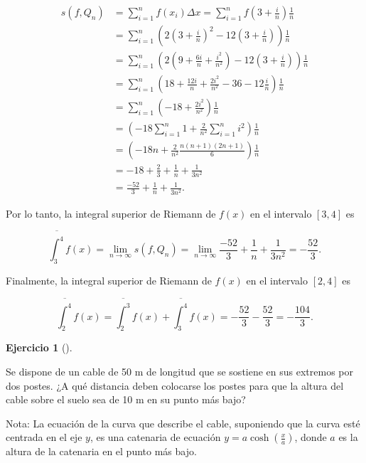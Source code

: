 \documentclass[
  spanish,
  a4paper,
]{scrreport}
\theoremstyle{definition}
\newtheorem{exercise}{Ejercicio}[chapter]
\theoremstyle{remark}
\begin{document}
\begin{tcolorbox}
\begin{align*}
s(f,Q_n)
&= \sum_{i=1}^{n} f(x_i) \Delta x = \sum_{i=1}^{n} f\left(3 + \frac{i}{n}\right) \frac{1}{n} \\
&= \sum_{i=1}^{n} \left(2\left(3 + \frac{i}{n}\right)^2 - 12\left(3 + \frac{i}{n}\right)\right) \frac{1}{n} \\
&= \sum_{i=1}^{n} \left(2\left(9 + \frac{6i}{n} + \frac{i^2}{n^2}\right) - 12\left(3 + \frac{i}{n}\right)\right) \frac{1}{n} \\
&= \sum_{i=1}^{n} \left(18 + \frac{12i}{n} + \frac{2i^2}{n^2} - 36 - 12\frac{i}{n}\right) \frac{1}{n} \\
&= \sum_{i=1}^{n} \left(-18 + \frac{2i^2}{n^2} \right) \frac{1}{n} \\
&= \left(-18\sum_{i=1}^{n} 1 + \frac{2}{n^2}\sum_{i=1}^n i^2 \right) \frac{1}{n} \\
&= \left(-18n + \frac{2}{n^2} \frac{n(n+1)(2n+1)}{6} \right) \frac{1}{n} \\
&= -18 + \frac{2}{3} + \frac{1}{n} + \frac{1}{3n^2} \\
&= \frac{-52}{3} + \frac{1}{n} + \frac{1}{3n^2}.
\end{align*}

Por lo tanto, la integral superior de Riemann de \(f(x)\) en el
intervalo \([3, 4]\) es

\[
\overline{\int_3^4} f(x)
= \lim_{n \to \infty} s(f,Q_n)
= \lim_{n \to \infty} \frac{-52}{3} + \frac{1}{n} + \frac{1}{3n^2} 
= -\frac{52}{3}.
\]

Finalmente, la integral superior de Riemann de \(f(x)\) en el intervalo
\([2, 4]\) es

\[
\overline{\int_2^4} f(x)
= \overline{\int_2^3} f(x) + \overline{\int_3^4} f(x)
= -\frac{52}{3} - \frac{52}{3}
= -\frac{104}{3}.
\]

\end{tcolorbox}

\begin{exercise}[]\protect\hypertarget{exr-2}{}\label{exr-2}

Se dispone de un cable de 50 m de longitud que se sostiene en sus
extremos por dos postes. ¿A qué distancia deben colocarse los postes
para que la altura del cable sobre el suelo sea de 10 m en su punto más
bajo?

Nota: La ecuación de la curva que describe el cable, suponiendo que la
curva esté centrada en el eje \(y\), es una catenaria de ecuación
\(y = a \cosh \left( \frac{x}{a} \right)\), donde \(a\) es la altura de
la catenaria en el punto más bajo.

\end{exercise}
\end{document}
